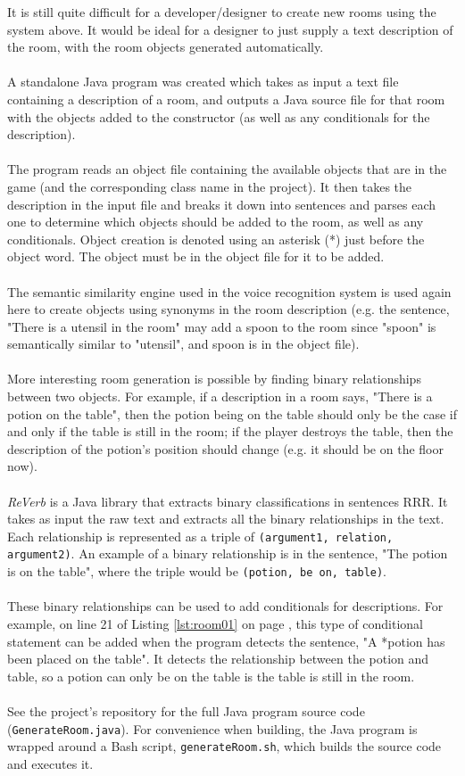 \documentclass[11pt]{article}
\begin{document}
It is still quite difficult for a developer/designer to create new rooms using the system above. It would be ideal for a designer to just supply a text description of the room, with the room objects generated automatically.
\\
\\
A standalone Java program was created which takes as input a text file containing a description of a room, and outputs a Java source file for that room with the objects added to the constructor (as well as any conditionals for the description).
\\
\\
The program reads an object file containing the available objects that are in the game (and the corresponding class name in the project). It then takes the description in the input file and breaks it down into sentences and parses each one to determine which objects should be added to the room, as well as any conditionals. Object creation is denoted using an asterisk (*) just before the object word. The object must be in the object file for it to be added.
\\
\\
The semantic similarity engine used in the voice recognition system is used again here to create objects using synonyms in the room description (e.g. the sentence, "There is a utensil in the room" may add a spoon to the room since "spoon" is semantically similar to "utensil", and spoon is in the object file).
\\
\\
More interesting room generation is possible by finding binary relationships between two objects. For example, if a description in a room says, "There is a potion on the table", then the potion being on the table should only be the case if and only if the table is still in the room; if the player destroys the table, then the description of the potion's position should change (e.g. it should be on the floor now).
\\
\\
\textit{ReVerb} is a Java library that extracts binary classifications in sentences RRR. It takes as input the raw text and extracts all the binary relationships in the text. Each relationship is represented as a triple of \texttt{(argument1, relation, argument2)}. An example of a binary relationship is in the sentence, "The potion is on the table", where the triple would be \texttt{(potion, be on, table)}.
\\
\\
These binary relationships can be used to add conditionals for descriptions. For example, on line 21 of Listing \ref{lst:room01} on page \pageref{lst:room01}, this type of conditional statement can be added when the program detects the sentence, "A *potion has been placed on the table". It detects the relationship between the potion and table, so a potion can only be on the table is the table is still in the room.
\\
\\
See the project's repository for the full Java program source code (\texttt{GenerateRoom.java}). For convenience when building, the Java program is wrapped around a Bash script, \texttt{generateRoom.sh}, which builds the source code and executes it.
\end{document}
